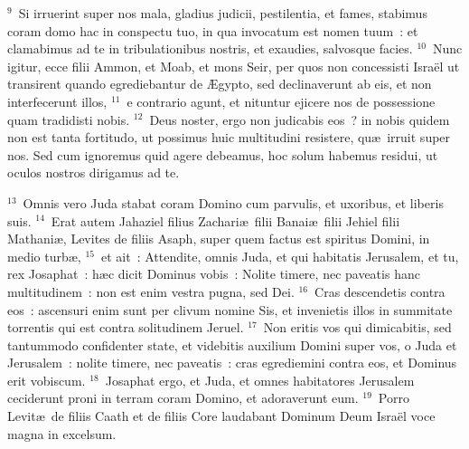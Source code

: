 ${}^{9}$~Si irruerint super nos mala, gladius judicii, pestilentia, et fames, stabimus coram domo hac in conspectu tuo, in qua invocatum est nomen tuum~: et clamabimus ad te in tribulationibus nostris, et exaudies, salvosque facies.
${}^{10}$~Nunc igitur, ecce filii Ammon, et Moab, et mons Seir, per quos non concessisti Isra\"el ut transirent quando egrediebantur de \AE gypto, sed declinaverunt ab eis, et non interfecerunt illos,
${}^{11}$~e contrario agunt, et nituntur ejicere nos de possessione quam tradidisti nobis.
${}^{12}$~Deus noster, ergo non judicabis eos~? in nobis quidem non est tanta fortitudo, ut possimus huic multitudini resistere, qu\ae\ irruit super nos. Sed cum ignoremus quid agere debeamus, hoc solum habemus residui, ut oculos nostros dirigamus ad te.


${}^{13}$~Omnis vero Juda stabat coram Domino cum parvulis, et uxoribus, et liberis suis.
${}^{14}$~Erat autem Jahaziel filius Zachari\ae\ filii Banai\ae\ filii Jehiel filii Mathani\ae , Levites de filiis Asaph, super quem factus est spiritus Domini, in medio turb\ae ,
${}^{15}$~et ait~: Attendite, omnis Juda, et qui habitatis Jerusalem, et tu, rex Josaphat~: h\ae c dicit Dominus vobis~: Nolite timere, nec paveatis hanc multitudinem~: non est enim vestra pugna, sed Dei.
${}^{16}$~Cras descendetis contra eos~: ascensuri enim sunt per clivum nomine Sis, et invenietis illos in summitate torrentis qui est contra solitudinem Jeruel.
${}^{17}$~Non eritis vos qui dimicabitis, sed tantummodo confidenter state, et videbitis auxilium Domini super vos, o Juda et Jerusalem~: nolite timere, nec paveatis~: cras egrediemini contra eos, et Dominus erit vobiscum.
${}^{18}$~Josaphat ergo, et Juda, et omnes habitatores Jerusalem ceciderunt proni in terram coram Domino, et adoraverunt eum.
${}^{19}$~Porro Levit\ae\ de filiis Caath et de filiis Core laudabant Dominum Deum Isra\"el voce magna in excelsum.


